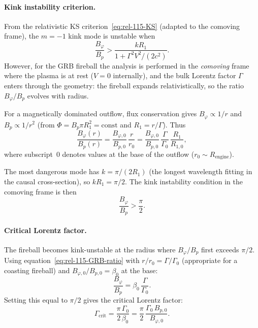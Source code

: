 \paragraph{Kink instability criterion.}
From the relativistic KS criterion~\eqref{eq:rel-115-KS}
(adapted to the comoving frame), the $m = -1$ kink mode is
unstable when
\begin{equation}
\frac{B_{\varphi}}{B_{p}}
  > \frac{kR_{1}}{1 + \Gamma^{2}V^{2}/(2c^{2})}.
\label{eq:rel-115-GRB-crit}
\end{equation}
However, for the GRB fireball the analysis is performed in the
\emph{comoving} frame where the plasma is at rest ($V = 0$
internally), and the bulk Lorentz factor $\Gamma$ enters through
the geometry: the fireball expands relativistically, so the
ratio $B_{\varphi}/B_{p}$ evolves with radius.

For a magnetically dominated outflow, flux conservation gives
$B_{\varphi} \propto 1/r$ and $B_{p} \propto 1/r^{2}$
(from $\Phi = B_{p}\pi R_{1}^{2} = \mathrm{const}$ and
$R_{1} = r/\Gamma$).  Thus
\begin{equation}
\frac{B_{\varphi}(r)}{B_{p}(r)}
  = \frac{B_{\varphi,0}}{B_{p,0}}\,\frac{r}{r_{0}}
  = \frac{B_{\varphi,0}}{B_{p,0}}\,\frac{\Gamma}{\Gamma_{0}}\,
    \frac{R_{1}}{R_{1,0}},
\label{eq:rel-115-GRB-ratio}
\end{equation}
where subscript~$0$ denotes values at the base of the outflow
($r_{0} \sim R_{\mathrm{engine}}$).

The most dangerous mode has $k = \pi/(2R_{1})$ (the longest
wavelength fitting in the causal cross-section), so
$kR_{1} = \pi/2$.  The kink instability condition in the
comoving frame is then
\begin{equation}
\frac{B_{\varphi}}{B_{p}} > \frac{\pi}{2}.
\label{eq:rel-115-GRB-crit2}
\end{equation}

\paragraph{Critical Lorentz factor.}
The fireball becomes kink-unstable at the radius where
$B_{\varphi}/B_{p}$ first exceeds $\pi/2$.  Using
equation~\eqref{eq:rel-115-GRB-ratio} with $r/r_{0} = \Gamma/\Gamma_{0}$
(appropriate for a coasting fireball) and
$B_{\varphi,0}/B_{p,0} = \beta_{0}$ at the base:
\begin{equation}
\frac{B_{\varphi}}{B_{p}}
  = \beta_{0}\,\frac{\Gamma}{\Gamma_{0}}.
\label{eq:rel-115-GRB-BratioG}
\end{equation}
Setting this equal to $\pi/2$ gives the critical Lorentz factor:
\begin{equation}
\boxed{\;
\Gamma_{\mathrm{crit}}
  = \frac{\pi\,\Gamma_{0}}{2\,\beta_{0}}
  = \frac{\pi}{2}\,\frac{\Gamma_{0}\,B_{p,0}}{B_{\varphi,0}}.
\;}
\label{eq:rel-115-GRB-Gcrit}
\end{equation}

